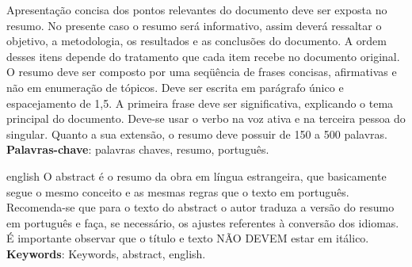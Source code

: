 \setlength{\absparsep}{18pt} %
\begin{resumo}
    Apresentação concisa dos pontos relevantes do documento deve ser exposta no resumo. No presente caso o resumo será informativo, assim deverá ressaltar o objetivo, a metodologia, os resultados e as conclusões do documento. A ordem desses itens depende do tratamento que cada item recebe no documento original. O resumo deve ser composto por uma seqüência de frases concisas, afirmativas e não em enumeração de tópicos. Deve ser escrita em parágrafo único e espacejamento de 1,5. A primeira frase deve ser significativa, explicando o tema principal do documento. Deve-se usar o verbo na voz ativa e na terceira pessoa do singular. Quanto a sua extensão, o resumo deve possuir de 150 a 500 palavras.   
    \vspace{\onelineskip}
    \noindent
    \textbf{Palavras-chave}: palavras chaves, resumo, português.
\end{resumo}

\begin{resumo}[Abstract]
    \begin{otherlanguage*}{english}
        O abstract é o resumo da obra em língua estrangeira, que basicamente segue o mesmo conceito e as mesmas regras que o texto em português. Recomenda-se que para o texto do abstract o autor traduza a versão do resumo em português e faça, se necessário, os ajustes referentes à conversão dos idiomas. É importante observar que o título e texto NÃO DEVEM estar em itálico.
	    \vspace{\onelineskip}
	    \noindent
	    \\
	    \textbf{Keywords}: Keywords, abstract, english.
    \end{otherlanguage*}
\end{resumo}